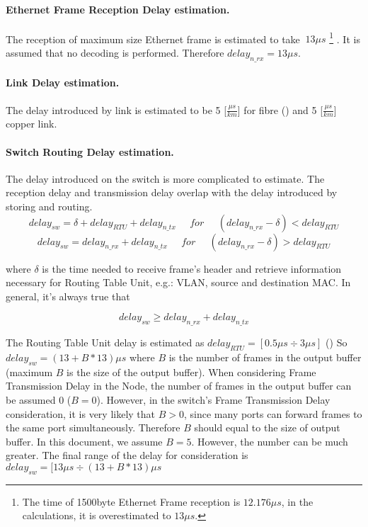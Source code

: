 \paragraph{Ethernet Frame Reception Delay estimation.} 

The reception of maximum size Ethernet frame is estimated to take $~13\mu s$
\footnote{The time of 1500byte Ethernet Frame reception is $12.176\mu s$,
in the calculations, it is overestimated to $13\mu s$.}  .
It is assumed that no decoding is performed. Therefore $delay_{n\_rx} = 13\mu
s$. 

\paragraph{Link Delay estimation.} 

The delay introduced by link is estimated to be 5 [$\frac{\mu s}{km}$] for fibre
\cite{PropagationDelay} () and 5
[$\frac{\mu
s}{km}$] copper \cite{FAIRtiming} link.

\paragraph{Switch Routing Delay estimation.} 

The delay introduced on the switch is more complicated to estimate. The
reception delay and transmission delay overlap with the delay introduced by
storing and routing.
\begin{equation}
	delay_{sw} =  \delta + delay_{RTU} + delay_{n\_tx}  
          \; \; \; \; \;
          for 
	  \; \; \; \; \;
	  (delay_{n\_rx} - \delta) < delay_{RTU}
\end{equation}	 
\begin{equation}
	delay_{sw} =  delay_{n\_rx} + delay_{n\_tx}
        \; \; \; \; \;
          for 
	\; \; \; \; \; 
        (delay_{n\_rx} - \delta) > delay_{RTU}
\end{equation}	

where  $\delta$ is the time needed to receive frame's header and retrieve
information necessary for Routing Table Unit, e.g.: VLAN, source and
destination MAC. In general, it's always true that 

\begin{equation}
	delay_{sw} \geq  delay_{n\_rx} + delay_{n\_tx}
\end{equation}	

The Routing Table Unit delay is estimated as $delay_{RTU} = [0.5\mu s \div 3\mu
s]$ ()
So  $delay_{sw} = (13 + B * 13)\mu s$ where $B$ is the number of
frames in the output buffer (maximum $B$ is the size of the output buffer). When
considering Frame Transmission Delay in the Node, the number of frames in the
output buffer can be assumed 0 ($B = 0$). However, in the switch's Frame
Transmission Delay consideration, it is very likely that $B > 0$, since many
ports can forward frames to the same port simultaneously. Therefore $B$ should
equal to the size of output buffer. In this document, we
assume $B=5$. However, the number can be much greater. The final range of the
delay for consideration is $delay_{sw} = [13 \mu s \div (13 + B * 13)\mu s$

